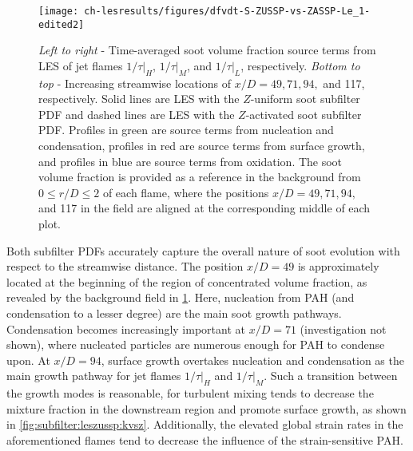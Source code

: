 \begin{figure}[H]
  \centering
  \texttt{[image: ch-lesresults/figures/dfvdt-S-ZUSSP-vs-ZASSP-Le\_1-edited2]}
  \caption[Radial \texorpdfstring{$\langle df_V/dt \rangle$}{<dfV/dt>} from LES with \texorpdfstring{$Z$}{Z}-Activated Soot Subfilter PDF]{\textit{Left to right} - Time-averaged soot volume fraction source terms from LES of jet flames $1/\tau|_H$, $1/\tau|_M$, and $1/\tau|_L$, respectively. \textit{Bottom to top} - Increasing streamwise locations of $x/D = 49, 71, 94,$ and 117, respectively. Solid lines are LES with the $Z$-uniform soot subfilter PDF and dashed lines are LES with the $Z$-activated soot subfilter PDF. Profiles in green are source terms from nucleation and condensation, profiles in red are source terms from surface growth, and profiles in blue are source terms from oxidation. The soot volume fraction is provided as a reference in the background from $0 \le r/D \le 2$ of each flame, where the positions $x/D = 49, 71, 94,$ and 117 in the field are aligned at the corresponding middle of each plot.}
  \label{fig:lesresults:zassp:radialdfvdt}
\end{figure}

Both subfilter PDFs accurately capture the overall nature of soot evolution with respect to the streamwise distance. The position $x/D = 49$ is approximately located at the beginning of the region of concentrated volume fraction, as revealed by the background field in \cref{fig:lesresults:zassp:radialdfvdt}. Here, nucleation from PAH (and condensation to a lesser degree) are the main soot growth pathways. Condensation becomes increasingly important at $x/D = 71$ (investigation not shown), where nucleated particles are numerous enough for PAH to condense upon. At $x/D = 94$, surface growth overtakes nucleation and condensation as the main growth pathway for jet flames $1/\tau|_H$ and $1/\tau|_M$. Such a transition between the growth modes is reasonable, for turbulent mixing tends to decrease the mixture fraction in the downstream region and promote surface growth, as shown in \cref{fig:subfilter:leszussp:kvsz}. Additionally, the elevated global strain rates in the aforementioned flames tend to decrease the influence of the strain-sensitive PAH. %

